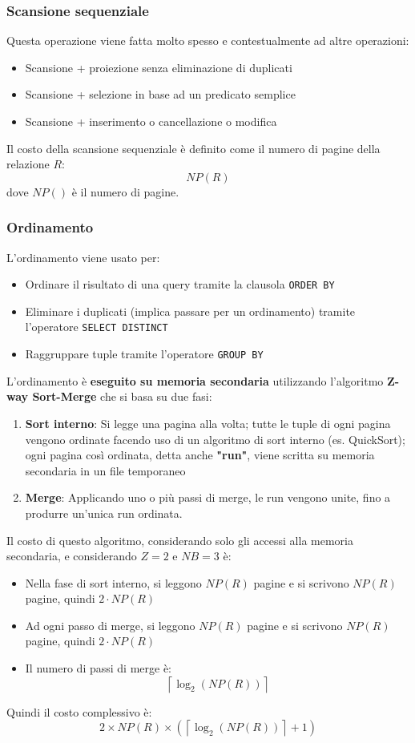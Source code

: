 \documentclass[a4paper]{article}
\begin{document}
\subsubsection{Scansione sequenziale}
Questa operazione viene fatta molto spesso e contestualmente ad altre operazioni:
\begin{itemize}
  \item Scansione + proiezione senza eliminazione di duplicati
  \item Scansione + selezione in base ad un predicato semplice
  \item Scansione + inserimento o cancellazione o modifica
\end{itemize}
Il costo della scansione sequenziale è definito come il numero di pagine della
relazione \( R \):
\[
  NP(R)
\] 
dove \( NP() \) è il numero di pagine.

\subsubsection{Ordinamento}
L'ordinamento viene usato per:
\begin{itemize}
  \item Ordinare il risultato di una query tramite la clausola \texttt{ORDER BY}
  \item Eliminare i duplicati (implica passare per un ordinamento) tramite
    l'operatore \texttt{SELECT DISTINCT}
  \item Raggruppare tuple tramite l'operatore \texttt{GROUP BY}
\end{itemize}
L'ordinamento è \textbf{eseguito su memoria secondaria} utilizzando l'algoritmo
\textbf{Z-way Sort-Merge} che si basa su due fasi:
\begin{enumerate}
  \item \textbf{Sort interno}: Si legge una pagina alla volta; tutte le tuple di ogni
    pagina vengono ordinate facendo uso di un algoritmo di sort interno
    (es. QuickSort); ogni pagina così ordinata, detta anche \textbf{"run"}, viene
    scritta su memoria secondaria in un file temporaneo

  \item \textbf{Merge}: Applicando uno o più passi di merge, le run vengono unite,
    fino a produrre un'unica run ordinata.
\end{enumerate}
Il costo di questo algoritmo, considerando solo gli accessi alla memoria secondaria,
e considerando \( Z = 2 \) e \( NB = 3 \) è:
\begin{itemize}
  \item Nella fase di sort interno, si leggono \( NP(R) \) pagine e si scrivono
    \( NP(R) \) pagine, quindi \( 2 \cdot NP(R) \)
  \item Ad ogni passo di merge, si leggono \( NP(R) \) pagine e si scrivono \( NP(R) \)
    pagine, quindi \( 2 \cdot NP(R) \)
  \item Il numero di passi di merge è:
    \[
      \left\lceil \log_2(NP(R)) \right\rceil 
    \] 
\end{itemize}
Quindi il costo complessivo è:
\[
  2 \times NP(R) \times \left( \left\lceil \log_2(NP(R)) \right\rceil + 1 \right) 
\] 
\end{document}

